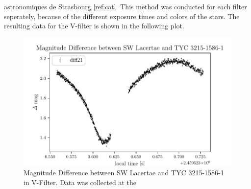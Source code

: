   astronomiques de Strasbourg \ref{ref:cat}.
  This method was conducted for each filter seperately, because of the different 
  exposure times and colors of the stars.
  The resulting data for the V-filter is shown in the following plot.
  \begin{figure}[H]
    \centering
    \includegraphics{V-Filter.pdf}
    \caption{Magnitude Difference between SW Lacertae and TYC 3215-1586-1 in V-Filter. Data 
    was collected at the }
    \label{fig:plot}
  \end{figure}

